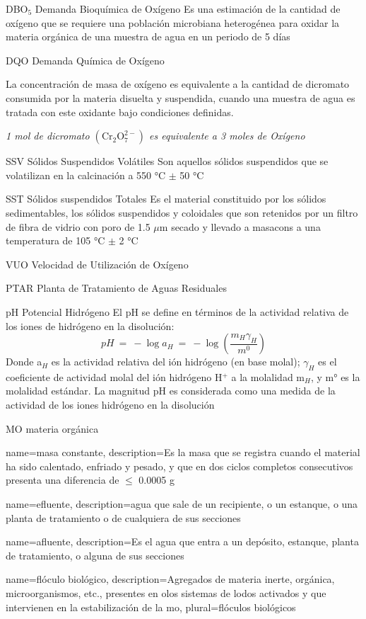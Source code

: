 {DBO$_{5}$}            %
{Demanda Bioquímica de Oxígeno}  %
{Es una estimación de la cantidad de oxígeno que se requiere una población microbiana heterogénea para oxidar la materia orgánica de una muestra de agua en un periodo de 5 días} %

{DQO}
{Demanda Química de Oxígeno}
{La concentración de masa de oxígeno es equivalente a la cantidad de dicromato consumida por la materia disuelta y suspendida, cuando una muestra de agua es tratada con este oxidante bajo condiciones definidas.
\begin{center}
	\emph{1 mol de dicromato $\mathrm{(Cr_{2}O_{7}^{2-})}$ es equivalente a 3 moles de Oxígeno}
\end{center}
}

{SSV}
{Sólidos Suspendidos Volátiles}
{Son aquellos sólidos suspendidos que se volatilizan en la calcinación a 550 °C $\pm$ 50 °C}

{SST}
{Sólidos suspendidos Totales}
{Es el material constituido por los sólidos sedimentables, los sólidos suspendidos y coloidales que son retenidos por un filtro de fibra de vidrio con poro de 1.5 $\mu$m secado y llevado a \gls{masacons} a una temperatura de 105 °C $\pm$ 2 °C}

{VUO}
{Velocidad de Utilización de Oxígeno}
{}

{PTAR}
{Planta de Tratamiento de Aguas Residuales}
{}

{pH}
{Potencial Hidrógeno}
{El pH se define en términos de la actividad relativa de los iones de hidrógeno en la disolución:
$$pH\ =\ -\log a_{H}\ =\ -\log (\frac{m_{H}\gamma_{H}}{m^{0}})$$
Donde a$_{H}$ es la actividad relativa del ión hidrógeno (en base molal); $\gamma_{H}$ es el coeficiente de actividad molal del ión hidrógeno H$^{+}$ a la molalidad m$_{H}$, y m° es la molalidad estándar. La magnitud pH es considerada como una medida de la actividad de los iones hidrógeno en la disolución}

{MO}
{materia orgánica}
{}

{
	name={masa constante},
	description={Es la masa que se registra cuando el material ha sido calentado, enfriado y pesado, y que en dos ciclos completos consecutivos presenta una diferencia de $\leq$ 0.0005 g}
}

{
	name={efluente},
	description={agua que sale de un recipiente, o un estanque, o una planta de tratamiento o de cualquiera de sus secciones}
}

{
	name=afluente,
	description={Es el agua que entra a un depósito, estanque, planta de tratamiento, o alguna de sus secciones}
}

{
	name={flóculo biológico},
	description={Agregados de materia inerte, orgánica, microorganismos, etc., presentes en olos sistemas de lodos activados y que intervienen en la estabilización de la \gls{mo}},
	plural={flóculos biológicos}
}